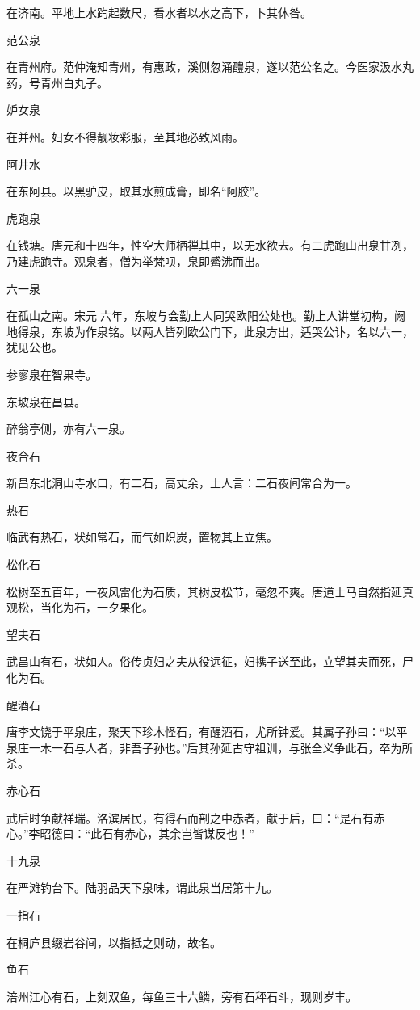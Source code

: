 \documentclass[a4paper,12pt,UTF8,twoside]{ctexbook}
\begin{document}
在济南。平地上水趵起数尺，看水者以水之高下，卜其休咎。

范公泉

在青州府。范仲淹知青州，有惠政，溪侧忽涌醴泉，遂以范公名之。今医家汲水丸药，号青州白丸子。

妒女泉

在并州。妇女不得靓妆彩服，至其地必致风雨。

阿井水

在东阿县。以黑驴皮，取其水煎成膏，即名“阿胶”。

虎跑泉

在钱塘。唐元和十四年，性空大师栖禅其中，以无水欲去。有二虎跑山出泉甘冽，乃建虎跑寺。观泉者，僧为举梵呗，泉即觱沸而出。

六一泉

在孤山之南。宋元六年，东坡与会勤上人同哭欧阳公处也。勤上人讲堂初构，阙地得泉，东坡为作泉铭。以两人皆列欧公门下，此泉方出，适哭公讣，名以六一，犹见公也。

参寥泉在智果寺。

东坡泉在昌县。

醉翁亭侧，亦有六一泉。

夜合石

新昌东北洞山寺水口，有二石，高丈余，土人言：二石夜间常合为一。

热石

临武有热石，状如常石，而气如炽炭，置物其上立焦。

松化石

松树至五百年，一夜风雷化为石质，其树皮松节，毫忽不爽。唐道士马自然指延真观松，当化为石，一夕果化。

望夫石

武昌山有石，状如人。俗传贞妇之夫从役远征，妇携子送至此，立望其夫而死，尸化为石。

醒酒石

唐李文饶于平泉庄，聚天下珍木怪石，有醒酒石，尤所钟爱。其属子孙曰：“以平泉庄一木一石与人者，非吾子孙也。”后其孙延古守祖训，与张全义争此石，卒为所杀。

赤心石

武后时争献祥瑞。洛滨居民，有得石而剖之中赤者，献于后，曰：“是石有赤心。”李昭德曰：“此石有赤心，其余岂皆谋反也！”

十九泉

在严滩钓台下。陆羽品天下泉味，谓此泉当居第十九。

一指石

在桐庐县缀岩谷间，以指抵之则动，故名。

鱼石

涪州江心有石，上刻双鱼，每鱼三十六鳞，旁有石秤石斗，现则岁丰。
\end{document}
